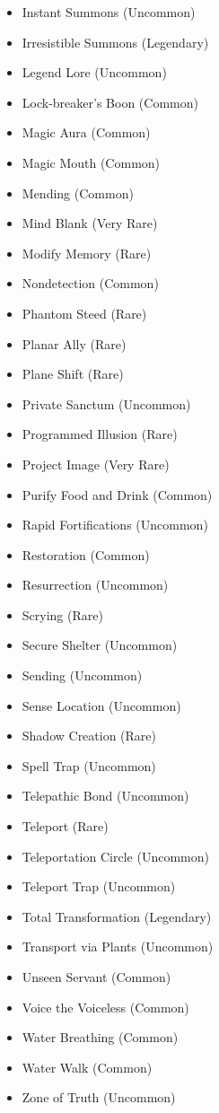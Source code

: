 \begin{itemize}
    \item Instant Summons (Uncommon)
    \item Irresistible Summons (Legendary)
    \item Legend Lore (Uncommon)
    \item Lock-breaker's Boon (Common)
    \item Magic Aura (Common)
    \item Magic Mouth (Common)
    \item Mending (Common)
    \item Mind Blank (Very Rare)
    \item Modify Memory (Rare)
    \item Nondetection (Common)
    \item Phantom Steed (Rare)
    \item Planar Ally (Rare)
    \item Plane Shift (Rare)
    \item Private Sanctum (Uncommon)
    \item Programmed Illusion (Rare)
    \item Project Image (Very Rare)
    \item Purify Food and Drink (Common)
    \item Rapid Fortifications (Uncommon)
    \item Restoration (Common)
    \item Resurrection (Uncommon)
    \item Scrying (Rare)
    \item Secure Shelter (Uncommon)
    \item Sending (Uncommon)
    \item Sense Location (Uncommon)
    \item Shadow Creation (Rare)
    \item Spell Trap (Uncommon)
    \item Telepathic Bond (Uncommon)
    \item Teleport (Rare)
    \item Teleportation Circle (Uncommon)
    \item Teleport Trap (Uncommon)
    \item Total Transformation (Legendary)
    \item Transport via Plants (Uncommon)
    \item Unseen Servant (Common)
    \item Voice the Voiceless (Common)
    \item Water Breathing (Common)
    \item Water Walk (Common)
    \item Zone of Truth (Uncommon)
\end{itemize}


